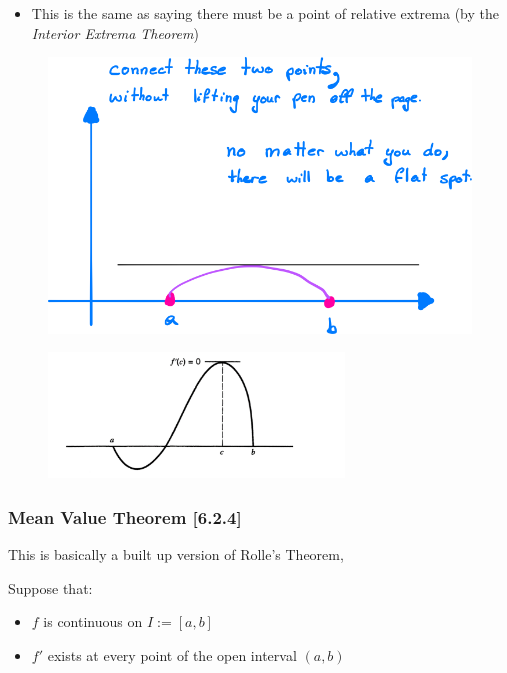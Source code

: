 \documentclass[class=article, crop=false]{standalone}
\begin{document}
\begin{itemize}
\item
  This is the same as saying there must be a point of relative extrema
  (by the \emph{Interior Extrema Theorem})
\end{itemize}

\begin{figure}
\centering
\includegraphics[width=0.7\columnwidth]{media/Continuity/f90f9756a7cc0b3ce971b414fb96a5f04d7c53dd.png}
\caption{}
\end{figure}

\begin{figure}
\centering
\includegraphics[width=0.7\textwidth]{media/Continuity/E744A1A9-00E0-4C46-971D-CE0A063D7664.jpeg}
\caption{}
\end{figure}

\hypertarget{header-n4032}{%
\subsubsection{Mean Value Theorem {[}6.2.4{]} }\label{header-n4032}}

This is basically a built up version of Rolle's Theorem,

Suppose that:

\begin{itemize}
\item
  \(f\) is continuous on \(I:= [a,b]\)
\item
  \(f'\) exists at every point of the open interval \((a,b)\)
\end{itemize}
\end{document}
